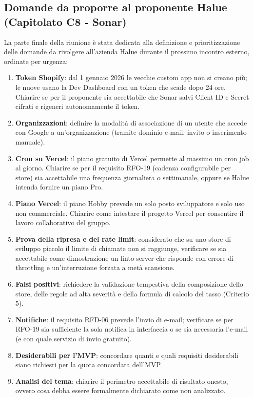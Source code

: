 \subsection{Domande da proporre al proponente Halue (Capitolato C8 - Sonar)}
La parte finale della riunione è stata dedicata alla definizione e prioritizzazione delle domande da rivolgere all'azienda Halue durante il prossimo incontro esterno, ordinate per urgenza:
\begin{enumerate}
    \item \textbf{Token Shopify}: dal 1 gennaio 2026 le vecchie custom app non si creano più; le nuove usano la Dev Dashboard con un token che scade dopo 24 ore. Chiarire se per il proponente sia accettabile che Sonar salvi Client ID e Secret cifrati e rigeneri autonomamente il token.
    \item \textbf{Organizzazioni}: definire la modalità di associazione di un utente che accede con Google a un'organizzazione (tramite dominio e-mail, invito o inserimento manuale).
    \item \textbf{Cron su Vercel}: il piano gratuito di Vercel permette al massimo un cron job al giorno. Chiarire se per il requisito RFO-19 (cadenza configurabile per store) sia accettabile una frequenza giornaliera o settimanale, oppure se Halue intenda fornire un piano Pro.
    \item \textbf{Piano Vercel}: il piano Hobby prevede un solo posto sviluppatore e solo uso non commerciale. Chiarire come intestare il progetto Vercel per consentire il lavoro collaborativo del gruppo.
    \item \textbf{Prova della ripresa e del rate limit}: considerato che su uno store di sviluppo piccolo il limite di chiamate non si raggiunge, verificare se sia accettabile come dimostrazione un finto server che risponde con errore di throttling e un'interruzione forzata a metà scansione.
    \item \textbf{Falsi positivi}: richiedere la validazione tempestiva della composizione dello store, delle regole ad alta severità e della formula di calcolo del tasso (Criterio 5).
    \item \textbf{Notifiche}: il requisito RFD-06 prevede l'invio di e-mail; verificare se per RFO-19 sia sufficiente la sola notifica in interfaccia o se sia necessaria l'e-mail (e con quale servizio di invio gratuito).
    \item \textbf{Desiderabili per l'MVP}: concordare quanti e quali requisiti desiderabili siano richiesti per la quota concordata dell'MVP.
    \item \textbf{Analisi del tema}: chiarire il perimetro accettabile di risultato onesto, ovvero cosa debba essere formalmente dichiarato come non analizzato.
\end{enumerate}

